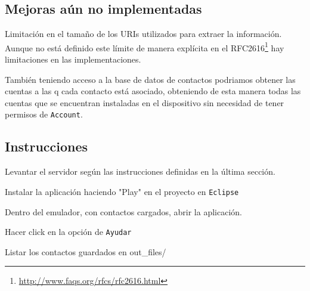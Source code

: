 \subsection{Mejoras a\'un no implementadas}
Limitaci\'on en el tama\~no de los URIs utilizados para extraer la informaci\'on. Aunque no est\'a definido este l\'imite de manera expl\'icita en el RFC2616\footnote{\url{http://www.faqs.org/rfcs/rfc2616.html}} hay limitaciones en las implementaciones.


Tambi\'en teniendo acceso a la base de datos de contactos podriamos obtener las cuentas a las q cada contacto est\'a asociado, obteniendo de esta manera todas las cuentas que se encuentran instaladas en el dispositivo sin necesidad de tener permisos de \texttt{Account}.


\subsection{Instrucciones}

Levantar el servidor seg\'un las instrucciones definidas en la \'ultima secci\'on.

Instalar la aplicaci\'on haciendo "Play" en el proyecto en \texttt{Eclipse}

Dentro del emulador, con contactos cargados, abrir la aplicaci\'on.

Hacer click en la opci\'on de \texttt{Ayudar}

Listar los contactos guardados en out\_files/

